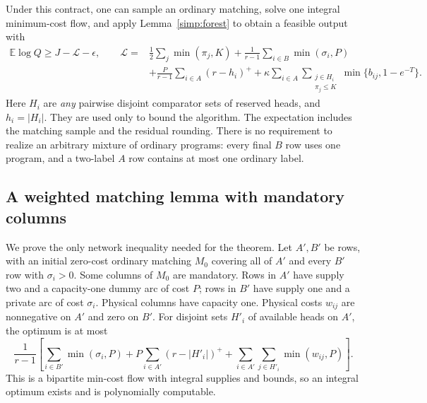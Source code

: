 \begin{theorem}\label{simp:repair-theorem}
Under this contract, one can sample an ordinary matching, solve one
integral minimum-cost flow, and apply Lemma~\ref{simp:forest} to obtain
a feasible output with
\begin{equation}\label{simp:repair-ledger}
 \begin{split}
 \mathbb E\log Q\ge J-\mathcal L-\epsilon,\qquad
 \mathcal L={}&\frac12\sum_j\min(\pi_j,K)
   +\frac1{r-1}\sum_{i\in B}\min(\sigma_i,P)\\
 &+\frac P{r-1}\sum_{i\in A}(r-h_i)^+
   +\kappa\sum_{i\in A}\sum_{\substack{j\in H_i\\\pi_j\le K}}
                      \min\{b_{ij},1-e^{-T}\}.
 \end{split}
\end{equation}
Here $H_i$ are \emph{any} pairwise disjoint comparator sets of reserved
heads, and $h_i=|H_i|$.  They are used only to bound the algorithm.
The expectation includes the matching sample and the residual rounding.
There is no requirement to realize an arbitrary mixture of ordinary
programs: every final $B$ row uses one program, and a two-label $A$ row
contains at most one ordinary label.
\end{theorem}

\subsection{A weighted matching lemma with mandatory columns}

We prove the only network inequality needed for the theorem.
Let $A',B'$ be rows, with an initial zero-cost ordinary matching $M_0$
covering all of $A'$ and every $B'$ row with $\sigma_i>0$.
Some columns of $M_0$ are mandatory.  Rows in $A'$ have supply two and
a capacity-one dummy arc of cost $P$; rows in $B'$ have supply one
and a private arc of cost $\sigma_i$.  Physical columns have capacity
one.  Physical costs $w_{ij}$ are nonnegative on $A'$ and zero on $B'$.
For disjoint sets $H'_i$ of available heads on $A'$, the optimum is at most
\begin{equation}\label{simp:mandatory-bound}
 \frac{1}{r-1}\left[
 \sum_{i\in B'}\min(\sigma_i,P)
 +P\sum_{i\in A'}(r-|H'_i|)^+
 +\sum_{i\in A'}\sum_{j\in H'_i}\min(w_{ij},P)\right].
\end{equation}
This is a bipartite min-cost flow with integral supplies and bounds,
so an integral optimum exists and is polynomially computable.

